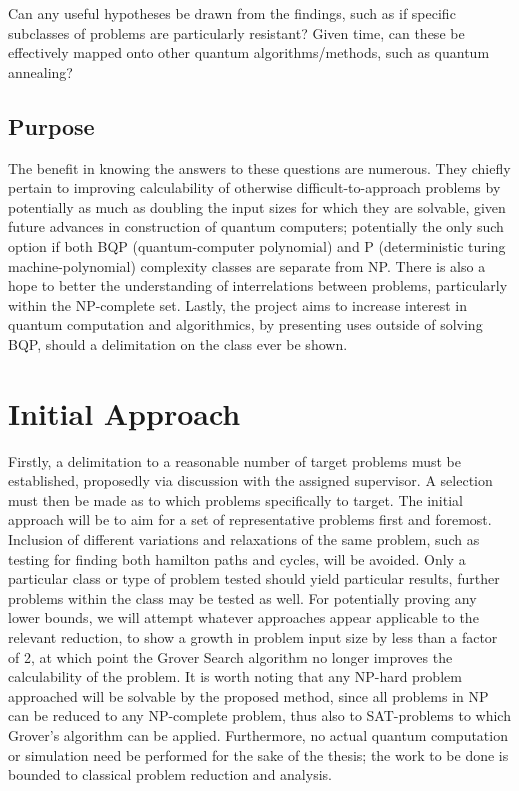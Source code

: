 \documentclass[msc,lith,english]{liuthesis}
\begin{document}
Can any useful hypotheses be drawn from the findings, such as if specific subclasses of problems are particularly resistant? Given time, can these be effectively mapped onto other quantum algorithms/methods, such as quantum annealing?

\subsection{Purpose}
The benefit in knowing the answers to these questions are numerous. They chiefly pertain to improving calculability of otherwise difficult-to-approach problems by potentially as much as doubling the input sizes for which they are solvable, given future advances in construction of quantum computers; potentially the only such option if both BQP (quantum-computer polynomial) and P (deterministic turing machine-polynomial) complexity classes are separate from NP. There is also a hope to better the understanding of interrelations between problems, particularly within the NP-complete set. Lastly, the project aims to increase interest in quantum computation and algorithmics, by presenting uses outside of solving BQP, should a delimitation on the class ever be shown.

\section{Initial Approach}
Firstly, a delimitation to a reasonable number of target problems must be established, proposedly via discussion with the assigned supervisor. A selection must then be made as to which problems specifically to target. The initial approach will be to aim for a set of representative problems first and foremost. Inclusion of different variations and relaxations of the same problem, such as testing for finding both hamilton paths and cycles, will be avoided. Only a particular class or type of problem tested should yield particular results, further problems within the class may be tested as well. For potentially proving any lower bounds, we will attempt whatever approaches appear applicable to the relevant reduction, to show a growth in problem input size by less than a factor of 2, at which point the Grover Search algorithm no longer improves the calculability of the problem. It is worth noting that any NP-hard problem approached will be solvable by the proposed method, since all problems in NP can be reduced to any NP-complete problem, thus also to SAT-problems to which Grover’s algorithm can be applied. Furthermore, no actual quantum computation or simulation need be performed for the sake of the thesis; the work to be done is bounded to classical problem reduction and analysis.

\printbibliography
\end{document}
